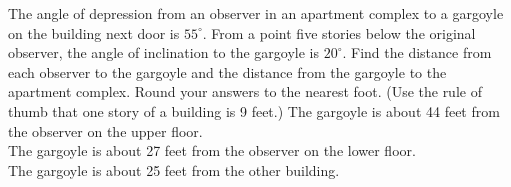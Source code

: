 { The angle of depression from an observer in an apartment complex to a gargoyle on the building next door is $55^{\circ}$.  From a point five stories below the original observer, the angle of inclination to the gargoyle is $20^{\circ}$.  Find the distance from each observer to the gargoyle and the distance from the gargoyle to the apartment complex.  Round your answers to the nearest foot.  (Use the rule of thumb that one story of a building is 9 feet.)  }
{The gargoyle is about 44 feet from the observer on the upper floor. \\The gargoyle is about 27 feet from the observer on the lower floor. \\The gargoyle is about 25 feet from the other building.}
